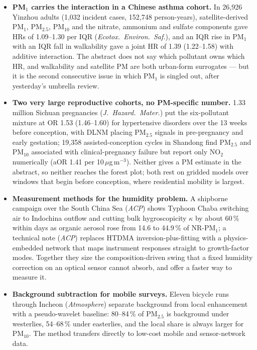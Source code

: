 \documentclass[10pt]{article}
\begin{document}
\footnotesize
\begin{itemize}

\item \textbf{PM$_1$ carries the interaction in a Chinese asthma cohort.} In 26,926 Yinzhou adults (1,032 incident cases, 152,748 person-years), satellite-derived PM$_1$, PM$_{2.5}$, PM$_{10}$ and the nitrate, ammonium and sulfate components gave HRs of 1.09--1.30 per IQR (\textit{Ecotox.\ Environ.\ Saf.}), and an IQR rise in PM$_1$ with an IQR fall in walkability gave a joint HR of 1.39 (1.22--1.58) with additive interaction. The abstract does not say which pollutant owns which HR, and walkability and satellite PM are both urban-form surrogates --- but it is the second consecutive issue in which PM$_1$ is singled out, after yesterday's umbrella review.

\item \textbf{Two very large reproductive cohorts, no PM-specific number.} 1.33 million Sichuan pregnancies (\textit{J.\ Hazard.\ Mater.}) put the six-pollutant mixture at OR 1.53 (1.46--1.60) for hypertensive disorders over the 13 weeks before conception, with DLNM placing PM$_{2.5}$ signals in pre-pregnancy and early gestation; 19,358 assisted-conception cycles in Shandong find PM$_{2.5}$ and PM$_{10}$ associated with clinical-pregnancy failure but report only NO$_2$ numerically (aOR 1.41 per 10\,$\mu$g\,m$^{-3}$). Neither gives a PM estimate in the abstract, so neither reaches the forest plot; both rest on gridded models over windows that begin before conception, where residential mobility is largest.

\item \textbf{Measurement methods for the humidity problem.} A shipborne campaign over the South China Sea (\textit{ACP}) shows Typhoon Chaba switching air to Indochina outflow and cutting bulk hygroscopicity $\kappa$ by about 60\,\% within days as organic aerosol rose from 14.6 to 44.9\,\% of NR-PM$_1$; a technical note (\textit{ACP}) replaces HTDMA inversion-plus-fitting with a physics-embedded network that maps instrument responses straight to growth-factor modes. Together they size the composition-driven swing that a fixed humidity correction on an optical sensor cannot absorb, and offer a faster way to measure it.

\item \textbf{Background subtraction for mobile surveys.} Eleven bicycle runs through Incheon (\textit{Atmosphere}) separate background from local enhancement with a pseudo-wavelet baseline: 80--84\,\% of PM$_{2.5}$ is background under westerlies, 54--68\,\% under easterlies, and the local share is always larger for PM$_{10}$. The method transfers directly to low-cost mobile and sensor-network data.


\end{itemize}
\end{document}
